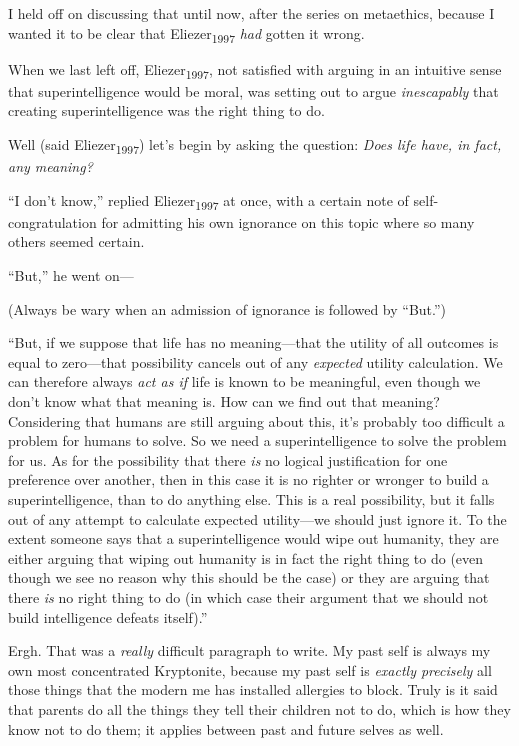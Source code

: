 {
 I held off on discussing that until now, after the series on
metaethics, because I wanted it to be clear that
Eliezer\textsubscript{1997} \textit{had} gotten it wrong.}

{
 When we last left off, Eliezer\textsubscript{1997}, not satisfied
with arguing in an intuitive sense that superintelligence would be
moral, was setting out to argue \textit{inescapably} that creating
superintelligence was the right thing to do.}

{
 Well (said Eliezer\textsubscript{1997}) let's
begin by asking the question: \textit{Does life have, in fact, any
meaning?}}

{
 ``I don't
know,'' replied Eliezer\textsubscript{1997} at once,
with a certain note of self-congratulation for admitting his own
ignorance on this topic where so many others seemed certain.}

{
 ``But,'' he went on---}

{
 (Always be wary when an admission of ignorance is followed by
``But.'')}

{
 ``But, if we suppose that life has no
meaning---that the utility of all outcomes is equal to zero---that
possibility cancels out of any \textit{expected} utility calculation.
We can therefore always \textit{act as if} life is known to be
meaningful, even though we don't know what that meaning
is. How can we find out that meaning? Considering that humans are still
arguing about this, it's probably too difficult a
problem for humans to solve. So we need a superintelligence to solve
the problem for us. As for the possibility that there \textit{is} no
logical justification for one preference over another, then in this
case it is no righter or wronger to build a superintelligence, than to
do anything else. This is a real possibility, but it falls out of any
attempt to calculate expected utility---we should just ignore it. To
the extent someone says that a superintelligence would wipe out
humanity, they are either arguing that wiping out humanity is in fact
the right thing to do (even though we see no reason why this should be
the case) or they are arguing that there \textit{is} no right thing to
do (in which case their argument that we should not build intelligence
defeats itself).''}

{
 Ergh. That was a \textit{really} difficult paragraph to write. My
past self is always my own most concentrated Kryptonite, because my
past self is \textit{exactly precisely} all those things that the
modern me has installed allergies to block. Truly is it said that
parents do all the things they tell their children not to do, which is
how they know not to do them; it applies between past and future selves
as well.}

